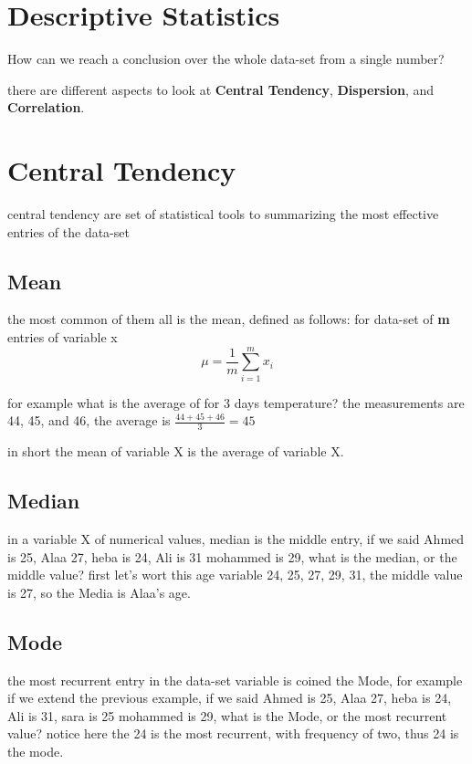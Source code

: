 \documentclass[4apaper,12pt]{book}
\begin{document}
  \section{Descriptive Statistics}
  \begin{description}
  \item How can we reach a conclusion over the whole data-set  from a single number?
  \item there are different aspects to look at \textbf{Central Tendency}, \textbf{Dispersion}, and \textbf{Correlation}.
    \section{Central Tendency}
    \begin{description}
    \item central tendency are set of statistical tools to summarizing the most effective entries  of the data-set
      \subsection{Mean}
    \item the most common of them all is the mean, defined as follows: for data-set of \textbf{m} entries of variable x
       \begin{equation} \mu = \frac{1}{m}\sum_{i=1}^{m}x_i \end{equation}
    \item for example what is the average of for 3 days temperature? the measurements are 44, 45, and 46, the average is $\frac{44+45+46}{3} = 45$
      \item in short the mean of variable X is the average of variable X.
    \end{description}
    \subsection{Median}
    \item in a variable X of numerical values, median is the middle entry, if we said Ahmed is 25, Alaa 27, heba is 24, Ali is 31 mohammed is 29, what is the median, or the middle value? first let's wort this age variable 24, 25, 27, 29, 31, the middle value is 27, so the Media is Alaa's age.
  \end{description}
  \subsection{Mode}
  \begin{description}
  \item the most recurrent entry in the data-set variable is coined the Mode, for example if we extend the previous example, if we said Ahmed is 25, Alaa 27, heba is 24, Ali is 31, sara is 25 mohammed is 29, what is the Mode, or the most recurrent value? notice here the 24 is the most recurrent, with frequency of two, thus 24 is the mode.
  \end{description}
\end{document}
